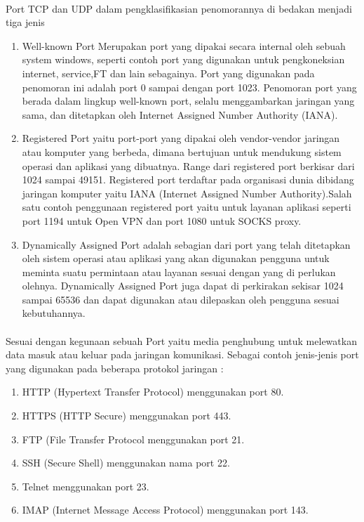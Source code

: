 \paragraph{}
\hspace{1cm}
Port TCP dan UDP dalam pengklasifikasian penomorannya di bedakan menjadi tiga jenis
\begin{enumerate}
\item Well-known Port Merupakan port yang dipakai secara internal oleh sebuah system windows, seperti contoh port yang digunakan untuk pengkoneksian internet, service,FT dan lain sebagainya. Port yang digunakan pada penomoran ini adalah port 0 sampai dengan port 1023. Penomoran port yang berada dalam lingkup well-known port, selalu menggambarkan jaringan yang sama, dan ditetapkan oleh Internet Assigned Number Authority (IANA).
\item Registered Port yaitu port-port yang dipakai oleh vendor-vendor jaringan atau komputer yang berbeda, dimana bertujuan  untuk mendukung sistem operasi dan aplikasi yang dibuatnya. Range dari registered port berkisar dari 1024 sampai 49151. Registered port terdaftar pada organisasi dunia dibidang jaringan komputer yaitu IANA (Internet Assigned Number Authority).Salah satu contoh penggunaan registered port yaitu untuk layanan aplikasi seperti port 1194 untuk Open VPN  dan port 1080 untuk SOCKS proxy.
\item Dynamically Assigned Port adalah sebagian dari port yang telah ditetapkan oleh sistem operasi atau aplikasi yang akan digunakan pengguna untuk meminta suatu permintaan atau layanan sesuai dengan yang di perlukan olehnya. Dynamically Assigned Port juga dapat di perkirakan sekisar 1024 sampai 65536 dan dapat digunakan atau dilepaskan oleh pengguna sesuai kebutuhannya.
\end{enumerate} 

\paragraph{}
\hspace{1cm}
Sesuai dengan kegunaan sebuah Port yaitu media penghubung untuk melewatkan data masuk atau keluar pada jaringan komunikasi. Sebagai contoh jenis-jenis port yang digunakan pada beberapa protokol jaringan :\\
\begin{enumerate}
\item HTTP (Hypertext Transfer Protocol) menggunakan port 80.
\item HTTPS (HTTP Secure) menggunakan port 443.
\item FTP (File Transfer Protocol menggunakan port 21.
\item SSH (Secure Shell) menggunakan nama port 22.
\item Telnet menggunakan port 23.
\item IMAP (Internet Message Access Protocol) menggunakan port 143.
\end{enumerate}

